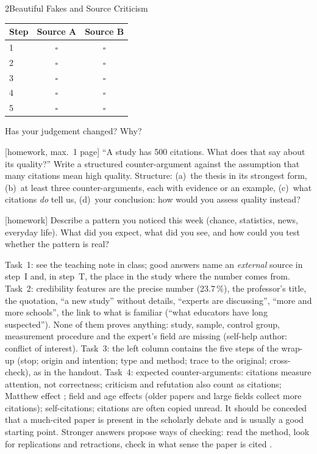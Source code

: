 \begin{uebungsblattb}{2}{Beautiful Fakes and Source Criticism}
\begin{center}
\renewcommand{\arraystretch}{1.6}
\begin{tabular}{|p{}|c|c|}
\hline
\textbf{Step} & \textbf{Source A} & \textbf{Source B} \\
\hline
1 \rule{0pt}{7mm} & $\square$ & $\square$ \\ \hline
2 \rule{0pt}{7mm} & $\square$ & $\square$ \\ \hline
3 \rule{0pt}{7mm} & $\square$ & $\square$ \\ \hline
4 \rule{0pt}{7mm} & $\square$ & $\square$ \\ \hline
5 \rule{0pt}{7mm} & $\square$ & $\square$ \\ \hline
\end{tabular}
\end{center}
Has your judgement changed? Why?

[homework, max.\ 1 page]
\enquote{A study has 500 citations. What does that say about its quality?}
Write a structured counter-argument against the assumption that many
citations mean high quality. Structure: (a)~the thesis in its strongest
form, (b)~at least three counter-arguments, each with evidence or an
example, (c)~what citations \emph{do} tell us, (d)~your conclusion: how
would you assess quality instead?

[homework]
Describe a pattern you noticed this week (chance, statistics, news,
everyday life). What did you expect, what did you see, and how could you
test whether the pattern is real?

\begin{lehrhinweis}
Task~1: see the teaching note in class; good answers name an
\emph{external} source in step~I and, in step~T, the place in the study
where the number comes from. Task~2: credibility features are the precise
number (23.7\,\%), the professor's title, the quotation, \enquote{a new
study} without details, \enquote{experts are discussing}, \enquote{more
and more schools}, the link to what is familiar (\enquote{what educators
have long suspected}). None of them proves anything: study, sample,
control group, measurement procedure and the expert's field are missing
(self-help author: conflict of interest). Task~3: the left column contains
the five steps of the wrap-up (stop; origin and intention; type and method;
trace to the original; cross-check), as in the handout. Task~4: expected
counter-arguments: citations measure attention, not correctness; criticism
and refutation also count as citations; Matthew effect
\parencite{merton1968matthew}; field and age effects (older papers and
large fields collect more citations); self-citations; citations are often
copied unread. It should be conceded that a much-cited paper is present in
the scholarly debate and is usually a good starting point. Stronger answers
propose ways of checking: read the method, look for replications and
retractions, check in what sense the paper is cited
\parencite{dora2012,hicks2015leiden}.
\end{lehrhinweis}
\end{uebungsblattb}

